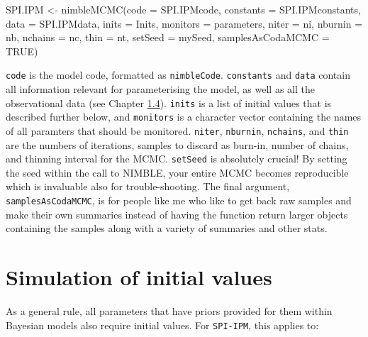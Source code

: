 \documentclass[
]{book}
\newenvironment{Shaded}{\begin{snugshade}}{\end{snugshade}}
\newcommand{\AttributeTok}[1]{\textcolor[rgb]{0.77,0.63,0.00}{#1}}
\newcommand{\ConstantTok}[1]{\textcolor[rgb]{0.00,0.00,0.00}{#1}}
\newcommand{\FunctionTok}[1]{\textcolor[rgb]{0.00,0.00,0.00}{#1}}
\newcommand{\NormalTok}[1]{#1}
\newcommand{\OtherTok}[1]{\textcolor[rgb]{0.56,0.35,0.01}{#1}}
\begin{document}
\begin{Shaded}
\begin{Highlighting}[]
\NormalTok{SPI.IPM }\OtherTok{\textless{}{-}} \FunctionTok{nimbleMCMC}\NormalTok{(}\AttributeTok{code =}\NormalTok{ SPI.IPMcode, }\AttributeTok{constants =}\NormalTok{ SPI.IPMconstants, }\AttributeTok{data =}\NormalTok{ SPI.IPMdata, }\AttributeTok{inits =}\NormalTok{ Inits, }\AttributeTok{monitors =}\NormalTok{ parameters, }\AttributeTok{niter =}\NormalTok{ ni, }\AttributeTok{nburnin =}\NormalTok{ nb, }\AttributeTok{nchains =}\NormalTok{ nc, }\AttributeTok{thin =}\NormalTok{ nt, }\AttributeTok{setSeed =}\NormalTok{ mySeed, }\AttributeTok{samplesAsCodaMCMC =} \ConstantTok{TRUE}\NormalTok{)}
\end{Highlighting}
\end{Shaded}

\texttt{code} is the model code, formatted as \texttt{nimbleCode}. \texttt{constants} and \texttt{data}
contain all information relevant for parameterising the model, as well as all
the observational data (see Chapter \protect\hyperlink{ux5cux23ux5cux2520Organisationux5cux2520forux5cux2520analysisux5cux2520withux5cux2520NIMBLE}{1.4}).
\texttt{inits} is a list of initial values that is described further below, and \texttt{monitors}
is a character vector containing the names of all paramters that should be
monitored. \texttt{niter}, \texttt{nburnin}, \texttt{nchains}, and \texttt{thin} are the numbers of iterations,
samples to discard as burn-in, number of chains, and thinning interval for the
MCMC. \texttt{setSeed} is absolutely crucial! By setting the seed within the call to
NIMBLE, your entire MCMC becomes reproducible which is invaluable also for
trouble-shooting. The final argument, \texttt{samplesAsCodaMCMC}, is for people like
me who like to get back raw samples and make their own summaries instead of
having the function return larger objects containing the samples along with
a variety of summaries and other stats.

\hypertarget{simulation-of-initial-values}{%
\section{Simulation of initial values}\label{simulation-of-initial-values}}

As a general rule, all parameters that have priors provided for them within
Bayesian models also require initial values. For \texttt{SPI-IPM}, this applies to:
\end{document}
